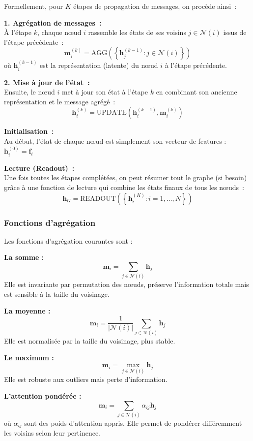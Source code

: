 Formellement, pour $K$ étapes de propagation de messages, on procède ainsi :

\textbf{1. Agrégation de messages :}\\
À l'étape $k$, chaque nœud $i$ rassemble les états de ses voisins $j \in \mathcal{N}(i)$ issus de l'étape précédente :
\[
\mathbf{m}_i^{(k)} = \text{AGG}\left(\left\{\mathbf{h}_j^{(k-1)} : j \in \mathcal{N}(i)\right\}\right)
\]
où $\mathbf{h}_i^{(k-1)}$ est la représentation (latente) du nœud $i$ à l'étape précédente.

\textbf{2. Mise à jour de l'état :}\\
Ensuite, le nœud $i$ met à jour son état à l'étape $k$ en combinant son ancienne représentation et le message agrégé :
\[
\mathbf{h}_i^{(k)} = \text{UPDATE}\left(\mathbf{h}_i^{(k-1)}, \mathbf{m}_i^{(k)}\right)
\]

\textbf{Initialisation :}\\
Au début, l'état de chaque nœud est simplement son vecteur de features :
$\mathbf{h}_i^{(0)} = \mathbf{f}_i$

\textbf{Lecture (Readout) :}\\
Une fois toutes les étapes complétées, on peut résumer tout le graphe (si besoin) grâce à une fonction de lecture qui combine les états finaux de tous les nœuds :
\[
\mathbf{h}_G = \text{READOUT}\left(\left\{\mathbf{h}_i^{(K)} : i = 1, \ldots, N\right\}\right)
\]

\subsubsection{Fonctions d'agrégation}

Les fonctions d'agrégation courantes sont :

\textbf{La somme :}
\[
\mathbf{m}_i = \sum_{j \in \mathcal{N}(i)} \mathbf{h}_j
\]
Elle est invariante par permutation des nœuds, préserve l'information totale mais est sensible à la taille du voisinage.

\textbf{La moyenne :}
\[
\mathbf{m}_i = \frac{1}{|\mathcal{N}(i)|}\sum_{j \in \mathcal{N}(i)} \mathbf{h}_j
\]
Elle est normalisée par la taille du voisinage, plus stable.

\textbf{Le maximum :}
\[
\mathbf{m}_i = \max_{j \in \mathcal{N}(i)} \mathbf{h}_j
\]
Elle est robuste aux outliers mais perte d'information.

\textbf{L'attention pondérée :}
\[
\mathbf{m}_i = \sum_{j \in \mathcal{N}(i)} \alpha_{ij} \mathbf{h}_j
\]
où $\alpha_{ij}$ sont des poids d'attention appris. Elle permet de pondérer différemment les voisins selon leur pertinence.

